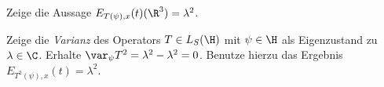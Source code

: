 \documentclass{subfiles}
\begin{document}
            \begin{Aufgabe}
                \nr{} Zeige die Aussage $E_{T(\psi),x}(t)(\R^3) = \lambda^2$. 

                \nr{} Zeige die \emph{Varianz} des Operators $T\in L_S(\H)$ mit $\psi\in\H$ als Eigenzustand zu $\lambda\in\C$. Erhalte $\var_\psi{T^2} = \lambda^2-\lambda^2 = 0$. Benutze hierzu das Ergebnis $E_{T^2(\psi),x}(t) = \lambda^2$. 
            \end{Aufgabe}
\end{document}
